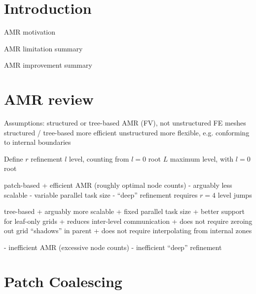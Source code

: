 \documentclass{article}
\begin{document}

\section{Introduction} \label{s:intro}

AMR motivation

AMR limitation summary

AMR improvement summary

\section{AMR review} \label{s:intro}

Assumptions: structured or tree-based AMR (FV), not unstructured FE meshes
  structured / tree-based more efficient
  unstructured more flexible, e.g. conforming to internal boundaries

Define
   $r$ refinement 
   $l$ level, counting from $l=0$ root
   $L$ maximum level, with $l=0$ root
   
patch-based
  + efficient AMR (roughly optimal node counts)
  - arguably less scalable
  - variable parallel task size
  - ``deep'' refinement requires $r=4$ level jumps
  
tree-based
  + arguably more scalable
  + fixed parallel task size
  + better support for leaf-only grids 
     + reduces inter-level communication
     + does not require zeroing out grid ``shadows'' in parent
     + does not require interpolating from internal zones
    
  - inefficient AMR (excessive node counts)
  - inefficient ``deep'' refinement


\section{Patch Coalescing} \label{s:intro}
\end{document}
